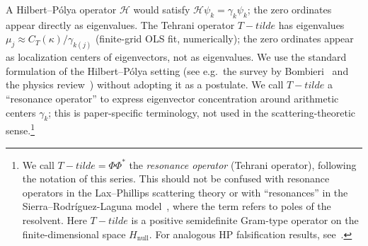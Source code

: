 \documentclass[11pt]{article}
\def\Tt{T-tilde}%
\newcommand{\Hnull}{H_{\mathrm{null}}}
\newcommand{\Tt}{\widetilde{T}}
\newcommand{\CT}{C_{T}}
\begin{document}
A Hilbert--P\'olya operator $\mathcal{H}$ would satisfy
$\mathcal{H}\psi_k = \gamma_k\psi_k$; the zero ordinates appear
directly as eigenvalues. The Tehrani operator $\Tt$ has eigenvalues
$\mu_j\approx\CT(\kappa)/\gamma_{k(j)}$ (finite-grid OLS fit, numerically); the zero ordinates appear
as localization centers of eigenvectors, not as eigenvalues. We use the
standard formulation of the Hilbert--P\'olya setting (see e.g.\ the
survey by Bombieri~\cite{Bombieri} and the physics
review~\cite{SchumayerHutchinson11}) without adopting it as a postulate.
We call $\Tt$ a ``resonance operator'' to express eigenvector
concentration around arithmetic centers $\gamma_k$; this is
paper-specific terminology, not used in the scattering-theoretic
sense.\footnote{We call $\Tt=\Phi\Phi^*$ the \emph{resonance operator}
(Tehrani operator), following the notation of this series.
This should not be confused with resonance operators in the
Lax--Phillips scattering theory or with ``resonances'' in the
Sierra--Rodr\'iguez-Laguna model~\cite{SierraRodriguez11}, where
the term refers to poles of the resolvent.
Here $\Tt$ is a positive semidefinite Gram-type operator
on the finite-dimensional space $\Hnull$.
For analogous HP falsification results, see~\cite{EndresSteiner10}.}
\end{document}
